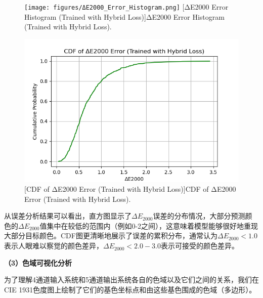 \begin{figure}[H]
\centering
{}
\texttt{[image: figures/ΔE2000\_Error\_Histogram.png]}
[ΔE2000 Error Histogram (Trained with Hybrid Loss)]{ΔE2000 Error Histogram (Trained with Hybrid Loss).}
\label{figure2: delta_e_histogram}
\end{figure}

\begin{figure}[H]
\centering
{}
\includegraphics[width=0.8\columnwidth]{figures/CDF.png}
[CDF of ΔE2000 Error (Trained with Hybrid Loss)]{CDF of ΔE2000 Error (Trained with Hybrid Loss).}
\label{figure2: delta_e_cdf}
\end{figure}

从误差分析结果可以看出，直方图显示了$\Delta E_{2000}$误差的分布情况，大部分预测颜色的$\Delta E_{2000}$值集中在较低的范围内（例如0-2之间），这意味着模型能够很好地重现大部分目标颜色。CDF图更清晰地展示了误差的累积分布，通常认为$\Delta E_{2000} < 1.0$表示人眼难以察觉的颜色差异，$\Delta E_{2000} < 2.0-3.0$表示可接受的颜色差异。

\noindent\textbf{（3）色域可视化分析}

为了理解4通道输入系统和5通道输出系统各自的色域以及它们之间的关系，我们在CIE 1931色度图上绘制了它们的基色坐标点和由这些基色围成的色域（多边形）。

